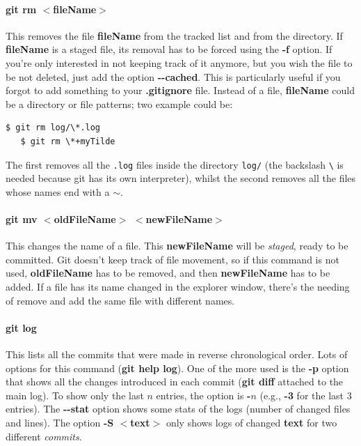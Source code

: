 \documentclass[a4paper, 12pt]{article}
\begin{document}
\paragraph{git rm $<$fileName$>$} This removes the file \textbf{fileName} from the tracked list and from the directory. If \textbf{fileName} is a staged file, its removal has to be forced using the \textbf{-f} option. If you're only interested in not keeping track of it anymore, but you wish the file to be not deleted, just add the option \textbf{-{}-cached}. This is particularly useful if you forgot to add something to your \textbf{.gitignore} file. Instead of a file, \textbf{fileName} could be a directory or file patterns; two example could be:
\begin{Verbatim}[commandchars=+\[\]]
   $ git rm log/\*.log
   $ git rm \*+myTilde
\end{Verbatim}
The first removes all the \verb|.log| files inside the directory \verb|log/| (the backslash \verb|\| is needed because git has its own interpreter), whilst the second removes all the files whose names end with a $\sim$.

\paragraph{git mv $<$oldFileName$>$ $<$newFileName$>$} This changes the name of a file. This \textbf{newFileName} will be \emph{staged}, ready to be committed. Git doesn't keep track of file movement, so if this command is not used, \textbf{oldFileName} has to be removed, and then \textbf{newFileName} has to be added. If a file has its name changed in the explorer window, there's the needing of remove and add the same file with different names.

\paragraph{git log} This lists all the commits that were made in reverse chronological order. Lots of options for this command (\textbf{git help log}). One of the more used is the \textbf{-p} option that shows all the changes introduced in each commit (\textbf{git diff} attached to the main log). To show only the last $n$ entries, the option is \textbf{-$n$} (e.g., \textbf{-3} for the last 3 entries). The \textbf{-{}-stat} option shows some stats of the logs (number of changed files and lines). The option \textbf{-S $<$text$>$} only shows logs of changed \textbf{text} for two different \emph{commits}.
\end{document}
